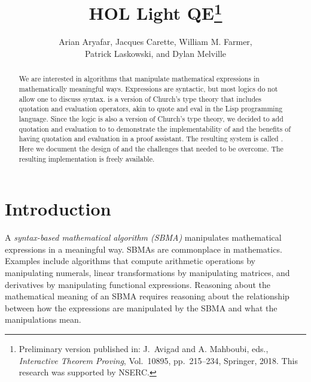 \documentclass[fleqn]{llncs}
\title{{\bf HOL Light QE}\thanks{Preliminary version published in:
    J.~Avigad and A. Mahboubi, eds., \emph{Interactive Theorem
      Proving}, Vol.~10895, pp.~215--234, Springer, 2018.  This
    research was supported by NSERC.}}
\author{Arian Aryafar, Jacques Carette, William M. Farmer,\\ Patrick
  Laskowski, and Dylan Melville}
\institute{%
Computing and Software, McMaster University, Canada\\
\url{http://www.cas.mcmaster.ca/~carette}\\
\url{http://imps.mcmaster.ca/wmfarmer}\\[1.5ex]
18 July 2019
}
\begin{document}
\maketitle

\begin{abstract}
We are interested in algorithms that manipulate mathematical
expressions in mathematically meaningful ways. Expressions are
syntactic, but most logics do not allow one to discuss syntax.
{\churchqe} is a version of Church's type theory that includes
quotation and evaluation operators, akin to quote and eval
in the Lisp programming language.  Since the {\HOL} logic is also a
version of Church's type theory, we decided to add quotation and
evaluation to {\HL} to demonstrate the implementability of {\churchqe}
and the benefits of having quotation and evaluation in a proof
assistant.  The resulting system is called {\HLQE}.  Here we document
the design of {\HLQE} and the challenges that needed to be overcome.
The resulting implementation is freely available.
\end{abstract}

\iffalse 

\textbf{Keywords:} Church's type theory, quotation and evaluation, HOL
Light, proof assistants, symbolic computation, reasoning about syntax,
metareasoning, reflection, biform theories.

\fi

\section{Introduction}\label{sec:introduction}

A \emph{syntax-based mathematical algorithm (SBMA)} manipulates
mathematical expressions in a meaningful way.  SBMAs
are commonplace in mathematics.  Examples include algorithms that
compute arithmetic operations by manipulating numerals, linear
transformations by manipulating matrices, and derivatives by
manipulating functional expressions.  Reasoning about the mathematical
meaning of an SBMA requires reasoning about the relationship between
how the expressions are manipulated by the SBMA and what the
manipulations mean.
\end{document}
